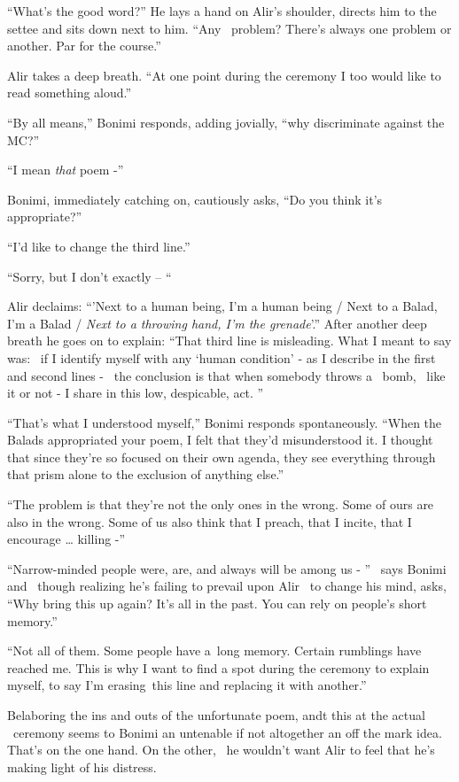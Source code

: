 \documentclass[twoside,11pt]{book}
\begin{document}
``What's the good word?'' He lays a hand on Alir's shoulder, directs him to the settee and
sits down next to him. ``Any \ problem? There's always one problem or another. Par for the
course.''

Alir takes a deep breath. ``At one point during the ceremony I too would like to read something
aloud.''

``By all means,'' Bonimi responds, adding jovially, ``why discriminate against
the MC?''

``I mean \textit{that} poem -''

Bonimi, immediately catching on, cautiously asks, ``Do you think it's appropriate?''

``I'd like to change the third line.''

``Sorry, but I don't exactly -- ``

Alir declaims: ``'Next to a human being, I'm a human being / Next to a Balad, I'm a Balad / \textit{Next to
a throwing hand, I'm the grenade}{}'.'' After another deep breath he goes on to explain:
``That third line is misleading. What I meant to say was:~ if I identify myself with any `human condition'
- as I describe in the first and second lines -~ the conclusion is that when somebody throws a~ bomb,~ like it or not -
I share in this low, despicable, act. ''

``That's what I understood myself,'' Bonimi responds spontaneously. ``When the
Balads appropriated your poem, I felt that they'd misunderstood it. I thought that since they're so focused on their
own agenda, they see everything through that prism alone to the exclusion of anything else.''

``The problem is that they're not the only ones in the wrong. Some of ours are also in the wrong. Some of
us also think that I preach, that I incite, that I encourage {\dots} killing -''

``Narrow-minded people were, are, and always will be among us - '' \ says Bonimi and \ though
realizing he's failing to prevail upon Alir \ to change his mind, asks, ``Why bring this up again? It's
all in the past. You can rely on people's short memory.''

``Not all of them. Some people have a~long memory. Certain rumblings have reached me. This is why I want to
find a spot during the ceremony to explain myself, to say I'm erasing~this line and replacing it with
another.''

Belaboring the ins and outs of the unfortunate poem, andt this at the actual \ ceremony seems to Bonimi an untenable if
not altogether an off the mark idea. That's on the one hand. On the other, \ he wouldn't want Alir to feel that he's
making light of his distress.
\end{document}
